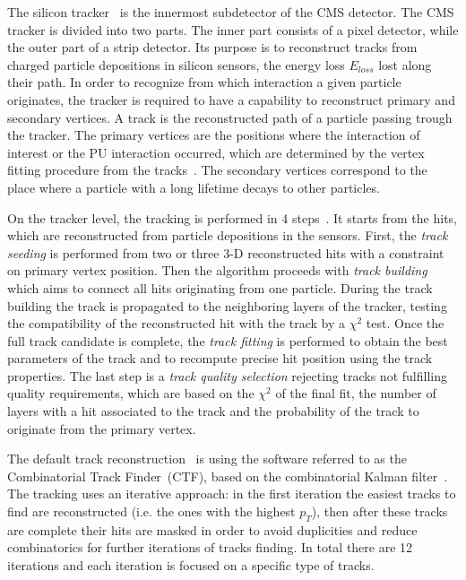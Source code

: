 The silicon tracker~\cite{CMS:1997tlf, CMS:2000eqx} is the innermost subdetector of the CMS detector. The CMS tracker is divided into two parts. The inner part consists of a pixel detector, while the outer part of a strip detector.  Its purpose is to reconstruct tracks from charged particle depositions in silicon sensors, the energy loss $E_{loss}$ lost along their path. In order to recognize from which interaction a given particle originates, the tracker is required to have a capability to reconstruct primary and secondary vertices. A track is the reconstructed path of a particle passing trough the tracker. The primary vertices are the positions where the interaction of interest or the PU interaction occurred, which are determined by the vertex fitting procedure from the tracks~\cite{Ball:2007zza}. The secondary vertices correspond to the place where a particle with a long lifetime decays to other particles. 

On the tracker level, the tracking is performed in 4 steps~\cite{website:slidesTracking, website:twikiTracking}. It starts from the hits, which are reconstructed from particle depositions in the sensors. First, the \textit{track seeding} is performed from two or three 3-D reconstructed hits with a constraint on primary vertex position. Then the algorithm proceeds with \textit{track building} which aims to connect all hits originating from one particle. During the track building the track is propagated to the neighboring layers of the tracker, testing the compatibility of the reconstructed hit with the track by a $\chi^{2}$ test. Once the full track candidate is complete, the \textit{track fitting} is performed to obtain the best parameters of the track and to recompute precise hit position using the track properties. The last step is a \textit{track quality selection} rejecting tracks not fulfilling quality requirements, which are based on the $\chi^{2}$ of the final fit, the number of layers with a hit associated to the track and the probability of the track  to originate from the primary vertex.

The default track reconstruction~\cite{Chatrchyan:2014fea} is using the software referred to as the Combinatorial Track Finder~(CTF), based on the combinatorial Kalman filter~\cite{Fruhwirth:1987fm}. The tracking uses an iterative approach: in the first iteration the easiest tracks to find are reconstructed (i.e. the ones with the highest $p_{T}$), then after these tracks are complete their hits are masked in order to avoid duplicities and reduce combinatorics for further iterations of tracks finding. In total there are 12 iterations and each iteration is focused on a specific type of tracks.


